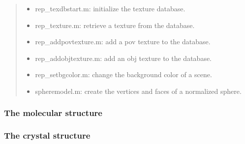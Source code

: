 \documentclass[a4paper]{article}
\begin{document}
\begin{quote}
\begin{itemize}
\item rep\_texdbstart.m: initialize the texture database.

\item rep\_texture.m: retrieve a texture from the database.

\item rep\_addpovtexture.m: add a pov texture to the database.

\item rep\_addobjtexture.m: add an obj texture to the database.

\item rep\_setbgcolor.m: change the background color of a scene.

\item spheremodel.m: create the vertices and faces of a normalized sphere.

\end{itemize}

\end{quote}


\subsubsection{The molecular structure%
  \label{the-molecular-structure}%
}


\subsubsection{The crystal structure%
  \label{the-crystal-structure}%
}
\end{document}
